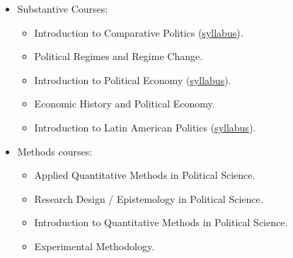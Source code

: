 \documentclass[10pt,stdletter,dateno,sigleft]{newlfm} %
\begin{document}
\begin{newlfm}



{\unskip}


\begin{itemize}
\item Substantive Courses:
	\begin{itemize}
	\item Introduction to Comparative Politics (\href{https://github.com/hbahamonde/Comparative_Politics_UGRAD/raw/master/Bahamonde_Comparative_Politics_Syllabus_UGRAD.pdf}{syllabus}).
	\item Political Regimes and Regime Change.
	\item Introduction to Political Economy (\href{https://github.com/hbahamonde/Political-Economy-Intro-UGrad/raw/master/Pol_Econ_Dev_Syllabus_UGRAD.pdf}{syllabus}).
	\item Economic History and Political Economy.
	\item Introduction to Latin American Politics (\href{https://github.com/hbahamonde/Latin_American_Politics_UGRAD/raw/master/Bahamonde_Latin_American_Politics_Syllabus_UGRAD.pdf}{syllabus}).
	\end{itemize}
\item Methods courses:
	\begin{itemize}
	\item Applied Quantitative Methods in Political Science.
	\item Research Design / Epistemology in Political Science.
	\item Introduction to Quantitative Methods in Political Science.
	\item Experimental Methodology.
	\end{itemize}
\end{itemize}




{\unskip}





\vspace{-10cm}



\end{newlfm}
\end{document}
